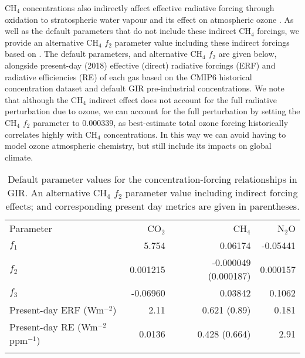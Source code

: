 \documentclass[gmd, manuscript]{copernicus}
\begin{document}
CH$_4$ concentrations also indirectly affect effective radiative forcing through oxidation to stratospheric water vapour and its effect on atmospheric ozone \citep{Noel2018,Owens1982,Myhre2013a}. As well as the default parameters that do not include these indirect CH$_4$ forcings, we provide an alternative CH$_4$ $f_2$ parameter value including these indirect forcings based on \cite{Myhre2013a}. The default parameters, and alternative CH$_4$ $f_2$ are given below, alongside present-day (2018) effective (direct) radiative forcings (ERF) and radiative efficiencies (RE) of each gas based on the CMIP6 historical concentration dataset \citep{Meinshausen2017} and default GIR pre-industrial concentrations. We note that although the CH$_4$ indirect effect does not account for the full radiative perturbation due to ozone, we can account for the full perturbation by setting the CH$_4$ $f_2$ parameter to 0.000339, as best-estimate total ozone forcing historically correlates highly with CH$_4$ concentrations. In this way we can avoid having to model ozone atmospheric chemistry, but still include its impacts on global climate.
\begin{table}[t]
    \caption{Default parameter values for the concentration-forcing relationships in GIR. An alternative CH$_4$ $f_2$ parameter value including indirect forcing effects; and corresponding present day metrics are given in parentheses.} \label{tab:forcparameters}
    \begin{tabular}{l r r r}
    \tophline
    Parameter & CO$_2$ & CH$_4$ & N$_2$O\\
    \middlehline
    $f_1$ & 5.754 & 0.06174 & -0.05441 \\
    $f_2$ & 0.001215 & -0.000049 (0.000187) & 0.000157 \\
    $f_3$ & -0.06960 & 0.03842 & 0.1062 \\
    \middlehline
    Present-day ERF (Wm$^{-2}$) & 2.11 & 0.621 (0.89) & 0.181 \\
    Present-day RE (Wm$^{-2}$ppm$^{-1}$) & 0.0136 & 0.428 (0.664) & 2.91 \\
    \bottomhline
    \end{tabular}
    \belowtable{} %
\end{table}
\end{document}
